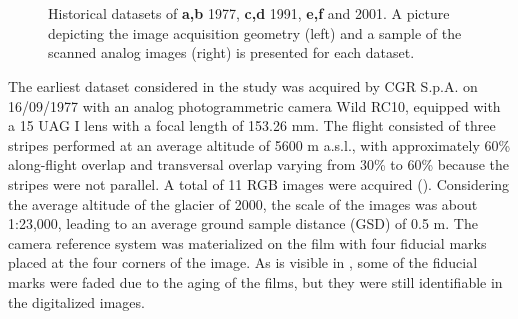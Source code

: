 \begin{figure}
{    } \\
     \quad
     \\
    \caption{Historical datasets of \textbf{a,b} 1977, \textbf{c,d} 1991, \textbf{e,f} and 2001. A picture depicting the image acquisition geometry (left) and a sample of the scanned analog images (right) is presented for each dataset.}
    \label{fig:2:datasets_historical}
\end{figure}

The earliest dataset considered in the study was acquired by CGR S.p.A. on 16/09/1977
with an analog photogrammetric camera Wild RC10, equipped with a 15 UAG I lens with
a focal length of 153.26 mm. 
The flight consisted of three stripes performed at an average altitude of 5600 m a.s.l., with approximately 60\% along-flight overlap and transversal overlap varying from 30\% to 60\% because the stripes were not parallel. 
A total of 11 RGB images were acquired (). 
Considering the average altitude of the glacier of \SI{2000}{\masl}, the scale of the images was about 1:23,000, leading to an average ground sample distance (GSD) of 0.5 m. 
The camera reference system was materialized on the film with four fiducial marks placed at the four corners of the image. As is visible in , some of the fiducial marks were faded due to the aging of the films, but they were still identifiable in the digitalized images.

